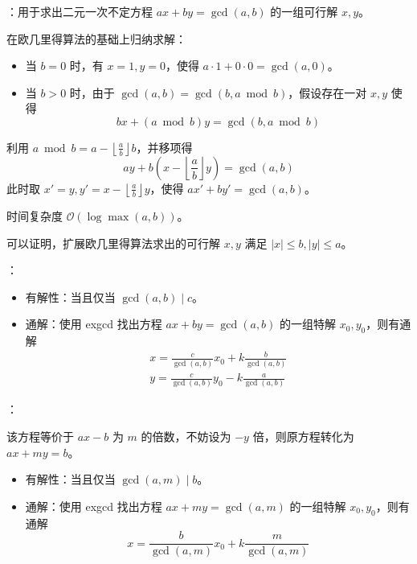 ：用于求出二元一次不定方程 $ax + by = \gcd(a, b)$ 的一组可行解 $x, y$。

在欧几里得算法的基础上归纳求解：

\begin{itemize}
    \item 当 $b = 0$ 时，有 $x = 1, y = 0$，使得 $a \cdot 1 + 0 \cdot 0 = \gcd(a, 0)$。
    \item 当 $b > 0$ 时，由于 $\gcd(a, b) = \gcd(b, a \bmod b)$，假设存在一对 $x, y$ 使得
    \[
    bx + (a \bmod b)y = \gcd(b, a \bmod b)
    \]
\end{itemize}

利用 $a \bmod b = a - \left\lfloor \frac{a}{b} \right\rfloor b$，并移项得
\[
ay + b\left(x - \left\lfloor \frac{a}{b} \right\rfloor y\right) = \gcd(a, b)
\]
此时取 $x' = y, y' = x - \left\lfloor \frac{a}{b} \right\rfloor y$，使得 $ax' + by' = \gcd(a, b)$。

时间复杂度 $\mathcal{O}(\log \max(a, b))$。

可以证明，扩展欧几里得算法求出的可行解 $x, y$ 满足 $|x| \leq b, |y| \leq a$。


：

\begin{itemize}
    \item 有解性：当且仅当 $\gcd(a, b) \mid c$。
    \item 通解：使用 exgcd 找出方程 $ax + by = \gcd(a, b)$ 的一组特解 $x_0, y_0$，则有通解
    \[
    \begin{gathered}
    x = \frac{c}{\gcd(a, b)}x_0 + k\frac{b}{\gcd(a, b)} \\
    y = \frac{c}{\gcd(a, b)}y_0 - k\frac{a}{\gcd(a, b)}
    \end{gathered}
    \]
\end{itemize}

：

该方程等价于 $ax - b$ 为 $m$ 的倍数，不妨设为 $-y$ 倍，则原方程转化为 $ax + my = b$。

\begin{itemize}
    \item 有解性：当且仅当 $\gcd(a, m) \mid b$。
    \item 通解：使用 exgcd 找出方程 $ax + my = \gcd(a, m)$ 的一组特解 $x_0, y_0$，则有通解
    \[
    x = \frac{b}{\gcd(a, m)}x_0 + k\frac{m}{\gcd(a, m)}
    \]
\end{itemize}

